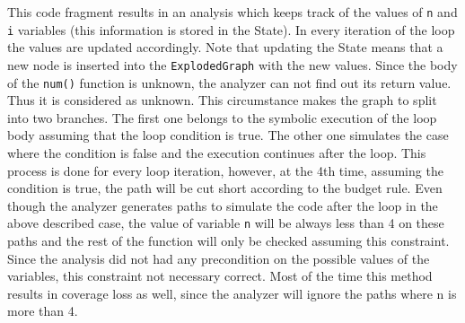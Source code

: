 This code fragment results in an analysis which keeps track of the values of 
\texttt{n} and \texttt{i} variables (this information is stored in the State). 
In every iteration of the loop the values are updated accordingly. Note that 
updating the
State means that a new node is inserted into the \texttt{ExplodedGraph} with the 
new 
values. Since the body of the \texttt{num()} function is unknown, the 
analyzer can not find out its return value. Thus it is considered as 
unknown. This circumstance
makes the graph to split into two branches. The first one belongs to the symbolic
execution of the loop body assuming that the loop condition is true. The 
other one simulates the case where the condition is false and the execution 
continues after the loop. This process is done for every loop iteration, 
however, at the 4th time, assuming the condition is true, the path will be cut 
short according to the budget rule.
Even though the analyzer generates paths to simulate the code after the loop 
in the above described case, the value of variable \texttt{n} will be 
always less than 4 on these paths and the rest of the function will only be 
checked assuming this constraint. Since the analysis did not had any 
precondition on the possible values of the variables, this constraint not 
necessary correct. Most of the time this method results in coverage loss as 
well, since the analyzer will ignore the paths where n is more than 4.
